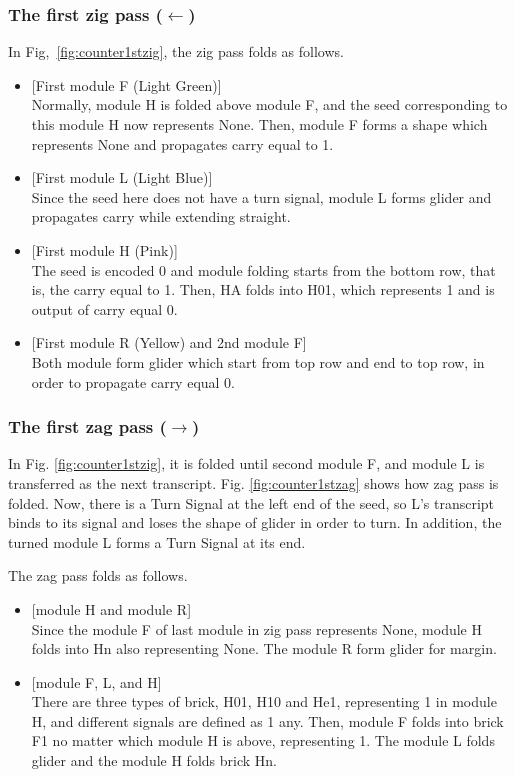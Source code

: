 \documentclass[runningheads]{llncs}
\begin{document}
\subsubsection{The first zig pass ($\leftarrow$)}
In Fig,~\ref{fig:counter1stzig}, the zig pass folds as follows.
\begin{itemize}
\item{[First module F (Light Green)]} \\Normally, module H is folded above module F, and the seed corresponding to this module H now represents None.
Then, module F forms a shape which represents None and propagates carry equal to 1.
\item{[First module L (Light Blue)]} \\Since the seed here does not have a turn signal, module L forms glider and propagates carry while extending straight.

\item{[First module H (Pink)]} \\The seed is encoded 0 and module folding starts from the bottom row, that is, the carry equal to 1.
Then, HA folds into H01, which represents 1 and is output of carry equal 0.

\item{[First module R (Yellow) and 2nd module F]} \\Both module form glider which start from top row and end to top row, in order to propagate carry equal 0.

\end{itemize}

\subsubsection{The first zag pass ($\rightarrow$)}
In Fig. \ref{fig:counter1stzig}, it is folded until second module F, and module L is transferred as the next transcript.
Fig. \ref{fig:counter1stzag} shows how zag pass is folded.
Now, there is a Turn Signal at the left end of the seed, so L's transcript binds to its signal and loses the shape of glider in order to turn.
In addition, the turned module L forms a Turn Signal at its end.

The zag pass folds as follows.
\begin{itemize}
\item{[module H and module R]} \\Since the module F of last module in zig pass represents None,
module H folds into Hn also representing None. The module R form glider for margin.
\item{[module F, L, and H]} \\There are three types of brick, H01, H10 and He1, representing 1 in module H, and different signals are defined as 1 any. Then, module F folds into brick F1 no matter which module H is above, representing 1. The module L folds glider and the module H folds brick Hn.

\end{itemize}
\end{document}
